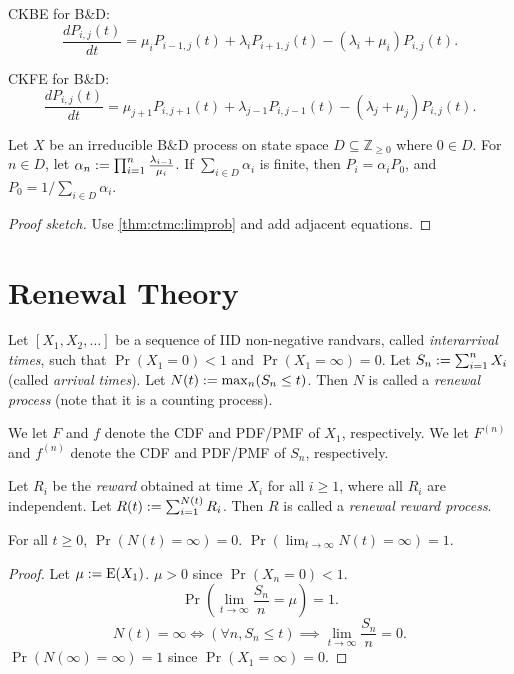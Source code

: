 \documentclass[a4paper, 12pt, fleqn]{article}
\begin{document}
CKBE for B\&D:
\[ \frac{dP_{i,j}(t)}{dt} = \mu_iP_{i-1,j}(t) + \lambda_iP_{i+1,j}(t) - (\lambda_i + \mu_i)P_{i,j}(t). \]

CKFE for B\&D:
\[ \frac{dP_{i,j}(t)}{dt} = \mu_{j+1}P_{i,j+1}(t) + \lambda_{j-1}P_{i,j-1}(t) - (\lambda_j + \mu_j)P_{i,j}(t). \]

\begin{theorem}
Let $X$ be an irreducible B\&D process on state space $D \subseteq \mathbb{Z}_{\ge 0}$ where $0 \in D$.
For $n \in D$, let $\alpha_n := \prod_{i=1}^n \frac{\lambda_{i-1}}{\mu_i}$.
If $\sum_{i \in D} \alpha_i$ is finite, then
$P_i = \alpha_iP_0$, and $P_0 = 1/\sum_{i \in D} \alpha_i$.
\end{theorem}
\begin{proof}[Proof sketch]
Use \cref{thm:ctmc:limprob} and add adjacent equations.
\end{proof}

\section{Renewal Theory}

\begin{definition}
Let $[X_1, X_2, \ldots]$ be a sequence of IID non-negative randvars, called \emph{interarrival times},
such that $\Pr(X_1 = 0) < 1$ and $\Pr(X_1 = \infty) = 0$.
Let $S_n := \sum_{i=1}^n X_i$ (called \emph{arrival times}). Let $N(t) := \max_n (S_n \le t)$.
Then $N$ is called a \emph{renewal process} (note that it is a counting process).

We let $F$ and $f$ denote the CDF and PDF/PMF of $X_1$, respectively.
We let $F^{(n)}$ and $f^{(n)}$ denote the CDF and PDF/PMF of $S_n$, respectively.

Let $R_i$ be the \emph{reward} obtained at time $X_i$ for all $i \ge 1$,
where all $R_i$ are independent. Let $R(t) := \sum_{i=1}^{N(t)} R_i$.
Then $R$ is called a \emph{renewal reward process}.
\end{definition}

\begin{lemma}
For all $t \ge 0$, $\Pr(N(t) = \infty) = 0$. $\Pr(\lim_{t \to \infty} N(t) = \infty) = 1$.
\end{lemma}
\begin{proof}
Let $\mu := \operatorname*{E}(X_1)$. $\mu > 0$ since $\Pr(X_n = 0) < 1$.
\[ \Pr\left(\lim_{t \to \infty} \frac{S_n}{n} = \mu\right) = 1.  \tag{strong law of large numbers} \]
\[ N(t) = \infty \iff (\forall n, S_n \le t) \implies \lim_{t \to \infty} \frac{S_n}{n} = 0. \]
$\Pr(N(\infty) = \infty) = 1$ since $\Pr(X_1 = \infty) = 0$.
\end{proof}
\end{document}
